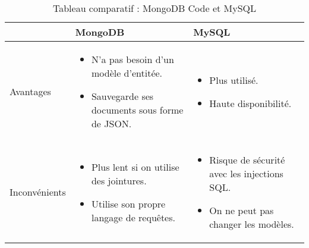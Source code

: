 \begin{table}[H]
    \begin{center}
        \begin{tabularx}{\textwidth} {
                | >{\centering\arraybackslash}X
                | >{\centering\arraybackslash}X
                | >{\centering\arraybackslash}X |}
            \hline
                          & MongoDB                                            & MySQL            \\
            \hline
            Avantages     & \begin{itemize}
                                \item N'a pas besoin d'un modèle d'entitée.
                                \item Sauvegarde ses documents sous forme de JSON.
                            \end{itemize} & \begin{itemize}
                                                \item Plus utilisé.
                                                \item Haute disponibilité.
                                            \end{itemize}                     \\
            \hline
            Inconvénients & \begin{itemize}
                                \item Plus lent si on utilise des jointures.
                                \item Utilise son propre langage de requêtes.
                            \end{itemize}      & \begin{itemize}
                                                     \item Risque de sécurité avec les injections SQL.
                                                     \item On ne peut pas changer les modèles.
                                                 \end{itemize} \\
            \hline
        \end{tabularx}
        \captionsetup{justification = centering}
        \caption{Tableau comparatif : MongoDB Code et MySQL}
        \label{compare_mongo_mysql}
    \end{center}
\end{table}


